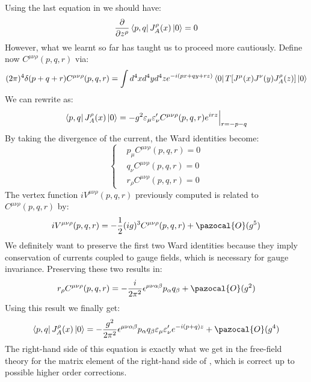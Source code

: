 \documentclass[../main.tex]{subfiles}
\begin{document}
Using the last equation in  we should have:
\[
\frac{\partial}{\partial z^\rho}\bra{p,q}J_A^\rho(x)\ket{0}=0
\]
However, what we learnt so far has taught us to proceed more cautiously. Define now $C^{\mu\nu\rho}(p,q,r)$ via:
\[
(2\pi)^4\delta(p+q+r)C^{\mu\nu\rho}(p,q,r)=\int d^4xd^4yd^4ze^{-i(px+qy+rz)}\bra{0}T[J^\mu(x)J^\nu(y)J^\rho_A(z)]\ket{0}
\]
We can rewrite  as:
\[
\bra{p,q}J_A^\rho(x)\ket{0}=-g^2\varepsilon_\mu\varepsilon_\nu'C^{\mu\nu\rho}(p,q,r)e^{irz}\Bigr|_{\substack{r=-p-q}}
\]
By taking the divergence of the current, the Ward identities become:
\[
\left\{
\begin{aligned}
&p_\mu C^{\mu\nu\rho}(p,q,r)=0\\
&q_\nu C^{\mu\nu\rho}(p,q,r)=0\\
&r_\rho C^{\mu\nu\rho}(p,q,r)=0
\end{aligned}
\right.
\]
The vertex function $iV^{\mu\nu\rho}(p,q,r)$ previously computed is related to $C^{\mu\nu\rho}(p,q,r)$ by:
\[
iV^{\mu\nu\rho}(p,q,r)=-\frac{1}{2}(ig)^3C^{\mu\nu\rho}(p,q,r)+\pazocal{O}(g^5)
\]
We definitely want to preserve the first two Ward identities because they imply conservation of currents coupled to gauge fields, which is necessary for gauge invariance. Preserving these two results in:
\[
r_\rho C^{\mu\nu\rho}(p,q,r)=-\frac{i}{2\pi^2}\epsilon^{\mu\nu\alpha\beta}p_\alpha q_\beta+\pazocal{O}(g^2)
\]
Using this result we finally get:
\[
\bra{p,q}J_A^\rho(x)\ket{0}=-\frac{g^2}{2\pi^2}\epsilon^{\mu\nu\alpha\beta}p_\alpha q_\beta\varepsilon_\mu\varepsilon_\nu'e^{-i(p+q)z}+\pazocal{O}(g^4)
\]
The right-hand side of this equation is exactly what we get in the free-field theory for the matrix element of the right-hand side of , which is correct up to possible higher order corrections.
\end{document}
